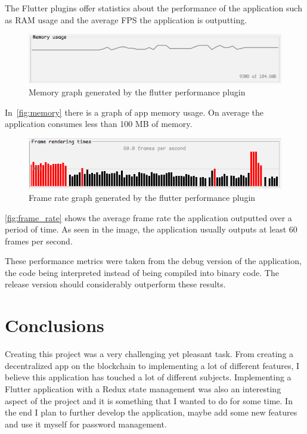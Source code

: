 \documentclass[a4paper,12pt]{report}
\begin{document}
The Flutter plugins offer statistics about the performance of the application
such as RAM usage and the average FPS the application is outputting.

\begin{figure}[H]
    \centering
    \includegraphics[scale=0.7]{images/app/memory.png}
    \caption{Memory graph generated by the flutter performance plugin}\label{fig:memory}
\end{figure}

In~\autoref{fig:memory} there is a graph of app memory usage. On average the
application consumes less than 100 MB of memory.

\begin{figure}[H]
    \centering
    \includegraphics[scale=0.7]{images/app/frame_rate.png}
    \caption{Frame rate graph generated by the flutter performance plugin}\label{fig:frame_rate}
\end{figure}

\autoref{fig:frame_rate} shows the average frame rate the application outputted
over a period of time. As seen in the image, the application usually outputs at
least 60 frames per second.

These performance metrics were taken from the debug version of the application,
the code being interpreted instead of being compiled into binary code. The
release version should considerably outperform these results.

\chapter{Conclusions}

Creating this project was a very challenging yet pleasant task. From creating a
decentralized app on the blockchain to implementing a lot of different
features, I believe this application has touched a lot of different subjects.
Implementing a Flutter application with a Redux state management was also an
interesting aspect of the project and it is something that I wanted to do for
some time. In the end I plan to further develop the application, maybe add some
new features and use it myself for password management.
\end{document}
